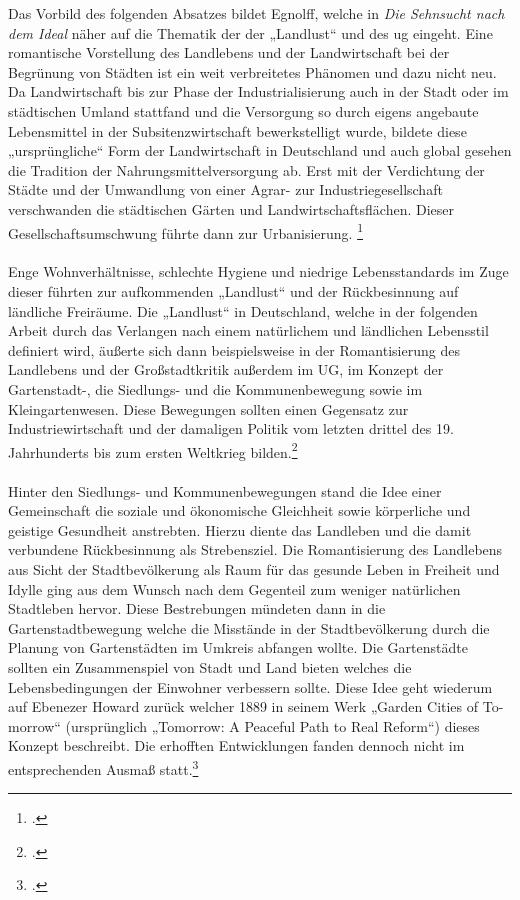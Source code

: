 \documentclass{scrartcl}
\begin{document}
Das Vorbild des folgenden Absatzes bildet Egnolff, welche in \textit{Die Sehnsucht nach dem Ideal} näher auf die Thematik der der „Landlust“ und des \acs{ug} eingeht.
Eine romantische Vorstellung des Landlebens und der Landwirtschaft bei der Begrünung von Städten ist ein weit verbreitetes Phänomen und dazu nicht neu. Da Landwirtschaft bis zur Phase der Industrialisierung auch in der Stadt oder im städtischen Umland stattfand und die Versorgung so durch eigens angebaute Lebensmittel in der Subsitenzwirtschaft bewerkstelligt wurde, bildete diese „ursprüngliche“ Form der Landwirtschaft in Deutschland und auch global gesehen die Tradition der Nahrungsmittelversorgung ab. Erst mit der Verdichtung der Städte und der Umwandlung von einer Agrar- zur Industriegesellschaft verschwanden die städtischen Gärten und Landwirtschaftsflächen. Dieser Gesellschaftsumschwung führte dann zur Urbanisierung. \footcite[Vgl.][S. 32ff]{Egnolff2015DieIdeal}\\
\\
Enge Wohnverhältnisse, schlechte Hygiene und niedrige Lebensstandards im Zuge dieser führten zur aufkommenden „Landlust“ und der Rückbesinnung auf ländliche Freiräume. Die „Landlust“ in Deutschland, welche in der folgenden Arbeit durch das Verlangen nach einem natürlichem und ländlichen Lebensstil definiert wird, äußerte sich dann beispielsweise in der Romantisierung des Landlebens und der Großstadtkritik außerdem im UG, im Konzept der Gartenstadt-, die Siedlungs- und die Kommunenbewegung sowie im Kleingartenwesen. Diese Bewegungen sollten einen Gegensatz zur Industriewirtschaft und der damaligen Politik vom letzten drittel des 19. Jahrhunderts bis zum ersten Weltkrieg bilden.\footcite[Vgl.][S. 35]{Egnolff2015DieIdeal}\\
\\
Hinter den Siedlungs- und Kommunenbewegungen stand die Idee einer Gemeinschaft die soziale und ökonomische Gleichheit sowie körperliche und geistige Gesundheit anstrebten. Hierzu diente das Landleben und die damit verbundene Rückbesinnung als Strebensziel. Die Romantisierung des Landlebens aus Sicht der Stadtbevölkerung als Raum für das gesunde Leben in Freiheit und Idylle ging aus dem Wunsch nach dem Gegenteil zum weniger natürlichen Stadtleben hervor. Diese Bestrebungen mündeten dann in die Gartenstadtbewegung welche die Misstände in der Stadtbevölkerung durch die Planung von Gartenstädten im Umkreis abfangen wollte. Die Gartenstädte sollten ein Zusammenspiel von Stadt und Land bieten welches die Lebensbedingungen der Einwohner verbessern sollte. Diese Idee geht wiederum auf Ebenezer Howard zurück welcher 1889 in seinem Werk „Garden Cities of To-morrow“ (ursprünglich „Tomorrow: A Peaceful Path to Real Reform“) dieses Konzept beschreibt. Die erhofften Entwicklungen fanden dennoch nicht im entsprechenden Ausmaß statt.\footcite[Vgl.][S. 36]{Egnolff2015DieIdeal}\\
\end{document}

